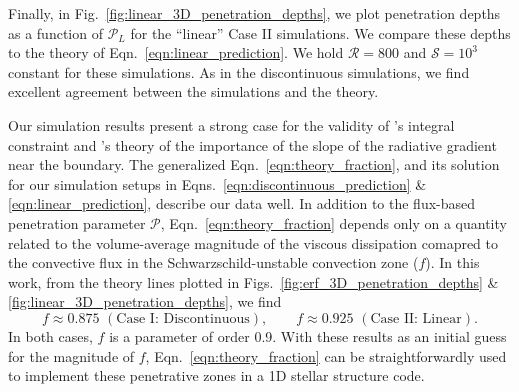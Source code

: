 \documentclass{aastex631}
\newcommand{\mP}{\ensuremath{\mathcal{P}}}
\newcommand{\mR}{\ensuremath{\mathcal{R}}}
\newcommand{\mS}{\ensuremath{\mathcal{S}}}
\begin{document}
Finally, in Fig.~\ref{fig:linear_3D_penetration_depths}, we plot penetration depths as a function of $\mP_L$ for the ``linear'' Case II simulations.
We compare these depths to the theory of Eqn.~\ref{eqn:linear_prediction}.
We hold $\mR = 800$ and $\mS = 10^3$ constant for these simulations.
As in the discontinuous simulations, we find excellent agreement between the simulations and the theory.

Our simulation results present a strong case for the validity of \citet{roxburgh1989}'s integral constraint and \citet{zahn1991}'s theory of the importance of the slope of the radiative gradient near the boundary.
The generalized Eqn.~\ref{eqn:theory_fraction}, and its solution for our simulation setups in Eqns.~\ref{eqn:discontinuous_prediction} \& \ref{eqn:linear_prediction}, describe our data well.
In addition to the flux-based penetration parameter $\mP$, Eqn.~\ref{eqn:theory_fraction} depends only on a quantity related to the volume-average magnitude of the viscous dissipation comapred to the convective flux in the Schwarzschild-unstable convection zone ($f$).
In this work, from the theory lines plotted in Figs.~\ref{fig:erf_3D_penetration_depths} \& \ref{fig:linear_3D_penetration_depths}, we find
\begin{equation}
f \approx 0.875\,\,(\text{Case I: Discontinuous}),\qquad
f \approx 0.925\,\,(\text{Case II: Linear}).
\label{eqn:fit_f_values}
\end{equation}
In both cases, $f$ is a parameter of order 0.9.
With these results as an initial guess for the magnitude of $f$, Eqn.~\ref{eqn:theory_fraction} can be straightforwardly used to implement these penetrative zones in a 1D stellar structure code.
\end{document}
